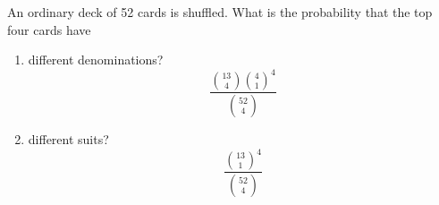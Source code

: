 \item An ordinary deck of 52 cards is shuffled. What is the probability that the top four cards have
\begin{enumerate}
    \item different denominations?
    \[ \frac{\binom{13}{4}\binom{4}{1}^4}{\binom{52}{4}} \]
    \item different suits?
    \[ \frac{\binom{13}{1}^4}{\binom{52}{4}} \]
\end{enumerate}
